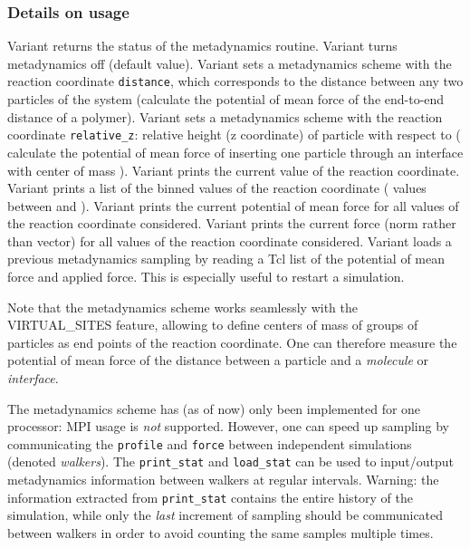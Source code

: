 \subsubsection{Details on usage}

Variant  returns the status of the metadynamics
routine. Variant  turns metadynamics off (default
value). Variant  sets a metadynamics scheme with the
reaction coordinate \texttt{distance}, which corresponds to the
distance between any two particles of the system (\eg calculate the
potential of mean force of the end-to-end distance of a
polymer). Variant  sets a metadynamics scheme with the
reaction coordinate \texttt{relative_z}: relative height (\ie z
coordinate) of particle  with respect to  (\eg
calculate the potential of mean force of inserting one particle
 through an interface with center of mass
). Variant  prints the current value of the
reaction coordinate. Variant  prints a list of the binned
values of the reaction coordinate (\eg {} values
between  and ). Variant
 prints the current potential of mean force for all values
of the reaction coordinate considered. Variant  prints the
current force (norm rather than vector) for all values of the reaction
coordinate considered. Variant  loads a previous
metadynamics sampling by reading a Tcl list of the potential of mean
force and applied force. This is especially useful to restart a
simulation.

Note that the metadynamics scheme works seamlessly with the
VIRTUAL_SITES feature, allowing to define centers of mass of groups of
particles as end points of the reaction coordinate. One can therefore
measure the potential of mean force of the distance between a particle
and a \emph{molecule} or \emph{interface}.

The metadynamics scheme has (as of now) only been implemented for one
processor: MPI usage is \emph{not} supported. However, one can speed up
sampling by communicating the \texttt{profile} and \texttt{force}
between independent simulations (denoted \emph{walkers}). The
\texttt{print_stat} and \texttt{load_stat} can be used to input/output
metadynamics information between walkers at regular
intervals. Warning: the information extracted from \texttt{print_stat}
contains the entire history of the simulation, while only the
\emph{last} increment of sampling should be communicated between
walkers in order to avoid counting the same samples multiple times.

